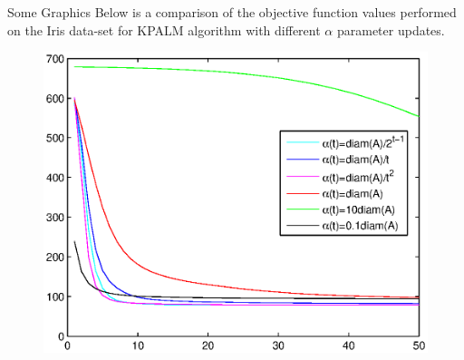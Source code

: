 \documentclass[9pt,handout]{beamer} %
\begin{document}
	\begin{frame}{Some Graphics}
		Below is a comparison of the objective function values performed on the Iris data-set for KPALM algorithm with different $\alpha$ parameter updates.
		\begin{figure}[ht]
    		\centering
        	\includegraphics[width=0.9 \textwidth]{dynamic_alpha_kpalm}
		\end{figure}
	\end{frame}
	
\end{document}
